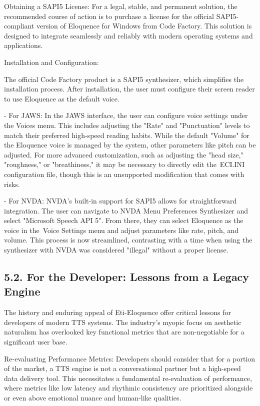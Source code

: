 Obtaining a SAPI5 License: For a legal, stable, and permanent
solution, the recommended course of action is to purchase a license for
the official SAPI5-compliant version of Eloquence for Windows from Code
Factory.\supercite{9} This solution is designed to integrate seamlessly and
reliably with modern operating systems and applications.

Installation and Configuration:

The official Code Factory product is a SAPI5 synthesizer, which
simplifies the installation process. After installation, the user must
configure their screen reader to use Eloquence as the default voice.

- For JAWS: In the JAWS interface, the user can configure voice
  settings under the Voices menu. This includes adjusting the
  "Rate" and "Punctuation" levels to match their preferred
  high-speed reading habits. While the default "Volume" for the
  Eloquence voice is managed by the system, other parameters like pitch
  can be adjusted.\supercite{20} For more advanced customization, such as
  adjusting the "head size," "roughness," or "breathiness," it may
  be necessary to directly edit the\
  ECI.INI configuration file, though this is an unsupported modification
  that comes with risks.\supercite{21}

- For NVDA: NVDA's built-in support for SAPI5 allows for
  straightforward integration. The user can navigate to NVDA Menu \>
  Preferences \> Synthesizer and select "Microsoft Speech API
  5".\supercite{22} From there, they can select Eloquence as the voice in the\
  Voice Settings menu and adjust parameters like rate, pitch, and
  volume.\supercite{23} This process is now streamlined, contrasting with a time
  when using the synthesizer with NVDA was considered "illegal"
  without a proper license.\supercite{22}

\subsection{5.2. For the Developer: Lessons from a Legacy Engine}
The history and enduring appeal of Eti-Eloquence offer critical lessons
for developers of modern TTS systems. The industry's myopic focus on
aesthetic naturalism has overlooked key functional metrics that are
non-negotiable for a significant user base.

Re-evaluating Performance Metrics: Developers should consider that
for a portion of the market, a TTS engine is not a conversational
partner but a high-speed data delivery tool. This necessitates a
fundamental re-evaluation of performance, where metrics like low latency
and rhythmic consistency are prioritized alongside or even above
emotional nuance and human-like qualities.\supercite{6}

